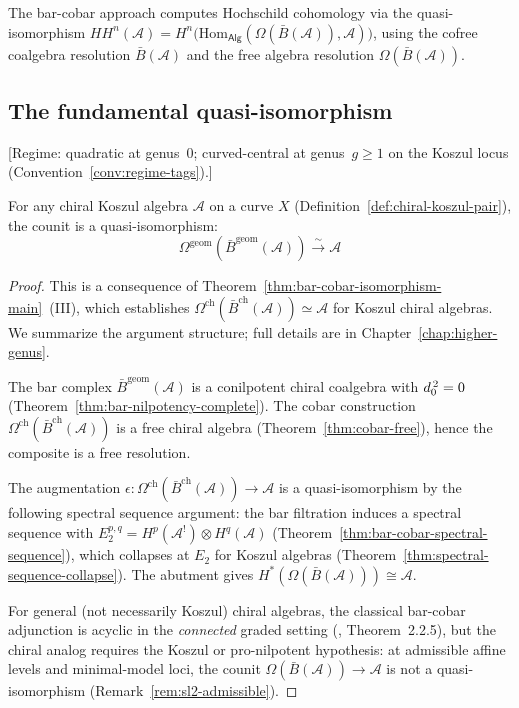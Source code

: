 The bar-cobar approach computes Hochschild cohomology via the quasi-isomorphism
$HH^n(\mathcal{A}) = H^n\bigl(\mathrm{Hom}_{\mathsf{Alg}}(\Omega(\bar{B}(\mathcal{A})),
\mathcal{A})\bigr)$,
using the cofree coalgebra resolution $\bar{B}(\mathcal{A})$ and the free algebra resolution $\Omega(\bar{B}(\mathcal{A}))$.

\subsection{The fundamental quasi-isomorphism}

\begin{theorem}\label{thm:bar-cobar-resolution}
\textup{[Regime: quadratic at genus~$0$; curved-central at genus~$g \geq 1$
on the Koszul locus
\textup{(}Convention~\textup{\ref{conv:regime-tags})}.]}

For any chiral Koszul algebra $\mathcal{A}$ on a curve $X$
\textup{(}Definition~\textup{\ref{def:chiral-koszul-pair})},
the counit is a quasi-isomorphism:
\[\Omega^{\text{geom}}(\bar{B}^{\text{geom}}(\mathcal{A})) \xrightarrow{\sim} \mathcal{A}\]
\end{theorem}

\begin{proof}
This is a consequence of Theorem~\ref{thm:bar-cobar-isomorphism-main}~(III), which establishes $\Omega^{\mathrm{ch}}(\bar{B}^{\mathrm{ch}}(\mathcal{A})) \simeq \mathcal{A}$ for Koszul chiral algebras.  We summarize the argument structure; full details are in Chapter~\ref{chap:higher-genus}.

The bar complex $\bar{B}^{\mathrm{geom}}(\mathcal{A})$ is a conilpotent
chiral coalgebra with $d_0^{\,2} = 0$
\textup{(}Theorem~\textup{\ref{thm:bar-nilpotency-complete}}\textup{)}.
The cobar construction $\Omega^{\mathrm{ch}}(\bar{B}^{\mathrm{ch}}(\mathcal{A}))$
is a free chiral algebra
\textup{(}Theorem~\textup{\ref{thm:cobar-free}}\textup{)}, hence the
composite is a free resolution.

The augmentation $\epsilon\colon \Omega^{\mathrm{ch}}(\bar{B}^{\mathrm{ch}}(\mathcal{A})) \to \mathcal{A}$ is a quasi-isomorphism by the following spectral sequence argument: the bar filtration induces a spectral sequence with $E_2^{p,q} = H^p(\mathcal{A}^!) \otimes H^q(\mathcal{A})$ (Theorem~\ref{thm:bar-cobar-spectral-sequence}), which collapses at $E_2$ for Koszul algebras (Theorem~\ref{thm:spectral-sequence-collapse}).  The abutment gives $H^*(\Omega(\bar{B}(\mathcal{A}))) \cong \mathcal{A}$.

For general (not necessarily Koszul) chiral algebras, the classical
bar-cobar adjunction is acyclic in the \emph{connected} graded
setting (\cite{LodayVallette}, Theorem~2.2.5), but the chiral
analog requires the Koszul or pro-nilpotent hypothesis: at
admissible affine levels and minimal-model loci, the counit
$\Omega(\bar{B}(\mathcal{A})) \to \mathcal{A}$ is not a
quasi-isomorphism (Remark~\ref{rem:sl2-admissible}).
\end{proof}

